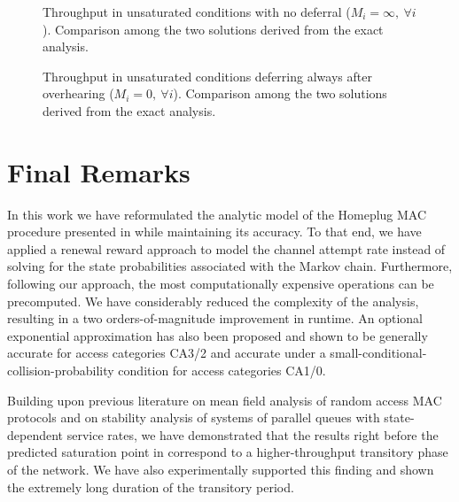 \documentclass[preprint,12pt]{elsarticle}
\begin{document}
\begin{figure*}[!tb]
\centering
{}
\caption{Throughput in unsaturated conditions with no deferral ($M_i = \infty,~ \forall i$). Comparison among the two solutions derived from the exact analysis.}
\label{fig:unsat_no_deferral}
\end{figure*}

\begin{figure*}[!tb]
\centering
{}
\caption{Throughput in unsaturated conditions deferring always after overhearing ($M_i = 0,~ \forall i$). Comparison among the two solutions derived from the exact analysis.}
\label{fig:unsat_always_defer}
\end{figure*}

\section{Final Remarks}\label{sec:remarks}

In this work we have reformulated the analytic model of the Homeplug MAC procedure presented in \cite{chung2006performance} while maintaining its accuracy. To that end, we have applied a renewal reward approach to model the channel attempt rate instead of solving for the state probabilities associated with the Markov chain. Furthermore, following our approach, the most computationally expensive operations can be precomputed. We have considerably reduced the complexity of the analysis, resulting in a two orders-of-magnitude improvement in runtime. An optional exponential approximation has also been proposed and shown to be generally accurate for access categories CA3/2 and accurate under a small-conditional-collision-probability condition for access categories CA1/0.

Building upon previous literature on mean field analysis of random access MAC protocols and on stability analysis of systems of parallel queues with state-dependent service rates, we have demonstrated that the results right before the predicted saturation point in \cite{chung2006performance} correspond to a higher-throughput transitory phase of the network. We have also experimentally supported this finding and shown the extremely long duration of the transitory period. 
\end{document}
